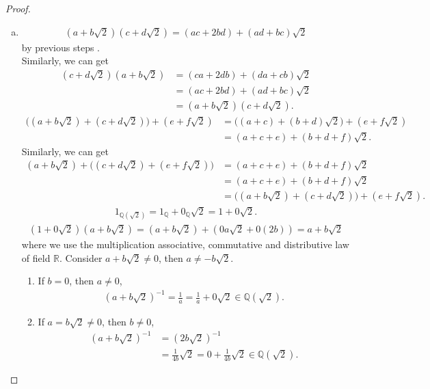 \documentclass{amsart}
\newcommand{\bbr}{\mathbb{R}}
\newcommand{\bbq}{\mathbb{Q}}
\theoremstyle{plain}
\theoremstyle{definition}
\begin{document}
\begin{proof}
\begin{enumerate}[(a)]
			\item
				\begin{align*}
				(a+b\sqrt 2) ( c+ d \sqrt 2) = (ac+2bd) +(ad+bc)\sqrt 2
			    \end{align*}
				by previous steps .\\
				Similarly, we can get 
				\begin{align*}
					( c+ d \sqrt 2) (a+b\sqrt 2) &= (ca+2db) +(da+cb)\sqrt 2 \\&= (ac+2bd) + (ad+bc)\sqrt 2 \\&= (a+b\sqrt 2) ( c+ d \sqrt 2).
				\end{align*}
				\begin{align*}
					\Big((a+b\sqrt 2) + ( c+ d \sqrt 2)\Big) + (e+f\sqrt 2) &= \Big((a+c) + (b+d) \sqrt 2\Big) + (e+f \sqrt 2) \\ &= (a+c+e)+(b+d+f) \sqrt 2.
			   \end{align*}
				Similarly, we can get 
				\begin{align*}
					(a+b\sqrt 2) + \Big(( c+ d \sqrt 2) + (e+f\sqrt 2)\Big) &= (a+c+e) + (b+d+f)\sqrt 2  \\&= (a+c+e) + (b+d+f)\sqrt 2 \\&= \Big((a+b\sqrt 2) + ( c+ d \sqrt 2)\Big) + (e+f\sqrt 2).
			   \end{align*}
			   \begin{align*}
				1_{\bbq(\sqrt 2)} = 1_{\bbq} + 0_{\bbq}\sqrt 2 = 1 + 0\sqrt 2.
			  \end{align*}
			  \begin{align*}
				(1+0\sqrt 2) (a+b\sqrt 2) = (a +b\sqrt 2)+(0a\sqrt2 + 0(2b)) = a + b\sqrt 2
			\end{align*}
			where we use the multiplication associative, commutative and distributive law of field $\bbr$.
				Consider $a+b\sqrt 2 \neq 0$, then $a \neq  -b\sqrt 2$.
				\begin{enumerate}[(1)]
					\item If $b=0$, then $a \neq 0$, 
						\begin{align*}
							(a+b\sqrt 2)^{-1} = \frac{1}{a}=\frac{1}{a}+0\sqrt 2 \in \bbq(\sqrt 2).
						\end{align*}
					\item If $a= b\sqrt 2 \neq 0$, then $b\neq 0$, 
						\begin{align*}
							(a+b\sqrt 2)^{-1} &= (2b\sqrt 2)^{-1}\\ &= \frac{1}{4b}\sqrt 2 =0 + \frac{1}{4b}\sqrt 2 \in \bbq(\sqrt 2).
						\end{align*}

\end{enumerate}
\end{enumerate}
\end{proof}
\end{document}
